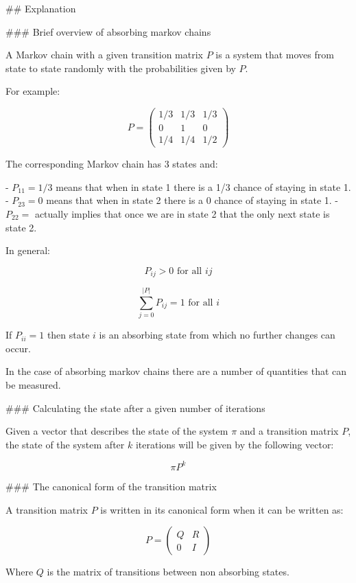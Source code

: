 \begin{md}
## Explanation

### Brief overview of absorbing markov chains

A Markov chain with a given transition matrix $P$ is a system that moves from
state to state randomly with the probabilities given by $P$.

For example:

$$
P = \begin{pmatrix}
        1 / 3 & 1 / 3 & 1 / 3 \\
        0     & 1     & 0     \\
        1 / 4 & 1 / 4 & 1 / 2
    \end{pmatrix}
$$

The corresponding Markov chain has 3 states and:

- $P_{11}=1/3$ means that when in state 1 there is a 1/3 chance of staying in
  state 1.
- $P_{23}=0$ means that when in state 2 there is a 0 chance of staying in
  state 1.
- $P_{22}=$ actually implies that once we are in state 2 that the only next
  state is state 2.

In general:

$$
    P_{ij} > 0 \text{ for all }ij
$$

$$
    \sum_{j=0}^{|P|} P_{ij} = 1 \text{ for all }i
$$

If $P_{ii}=1$ then state $i$ is an absorbing state from which no further changes
can occur.

In the case of absorbing markov chains there are a number of quantities that can
be measured.

### Calculating the state after a given number of iterations

Given a vector that describes the state of the system $\pi$ and a transition
matrix $P$, the state of the system after $k$ iterations will be given by the
following vector:

$$
    \pi P ^ k
$$

### The canonical form of the transition matrix

A transition matrix $P$ is written in its canonical form when it can be written
as:

$$
  P =
  \left(\begin{array}{c|c}
    Q & R \\\hline
    0 & I
  \end{array}\right)
$$

Where $Q$ is the matrix of transitions between non absorbing states.


\end{md}
